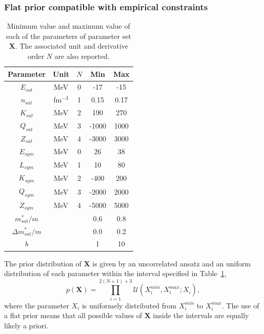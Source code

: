 \subsubsection{Flat prior compatible with empirical constraints}\label{subsubsec:prior}

\begin{table}[!t]
  \begin{center}
    \begin{tabular}{ccccc} 
      \toprule
      \toprule
      Parameter & Unit & $N$ & Min & Max \\
      \midrule
      $E_{sat}$ & MeV & 0         & -17   & -15  \\
      $n_{sat}$ & fm$^{-3}$ & 1   & 0.15  & 0.17 \\ 
      $K_{sat}$ & MeV & 2         & 190   & 270  \\ 
      $Q_{sat}$ & MeV & 3         & -1000 & 1000 \\ 
      $Z_{sat}$ & MeV & 4         & -3000 & 3000 \\ 
      $E_{sym}$ & MeV & 0         & 26    & 38   \\
      $L_{sym}$ & MeV & 1         & 10    & 80   \\
      $K_{sym}$ & MeV & 2         & -400  & 200  \\
      $Q_{sym}$ & MeV & 3         & -2000 & 2000 \\
      $Z_{sym}$ & MeV & 4         & -5000 & 5000 \\
      $m_{sat}^*/m$ & &           & 0.6   & 0.8  \\
      $\Delta m_{sat}^*/m$ & &    & 0.0   & 0.2  \\
      $b$ & &                     & 1     & 10   \\
      \bottomrule
      \bottomrule
    \end{tabular}
  \end{center}
  \caption[Minimum value and maximum value of each of the empirical parameters
  for the prior distribution]{Minimum value and maximum value of each of the
    parameters of parameter set $\bm{X}$. The associated unit and derivative 
  order $N$ are also reported.}\label{table:prior}
\end{table}

The prior distribution of $\bm{X}$ is given by an uncorrelated ansatz and an
uniform distribution of each parameter within the interval specified in
Table~\ref{table:prior},
%
\begin{equation}
  p(\bm{X}) = \prod_{i=1}^{2(N+1)+3} \mathcal{U}(X_i^{min}, X_i^{max};X_i),
\end{equation}
%
where the parameter $X_i$ is uniformely distributed from $X_i^{min}$ to 
$X_i^{max}$. The use of a flat prior means that all possible values of 
$\bm{X}$ inside the intervals are equally likely a priori.

